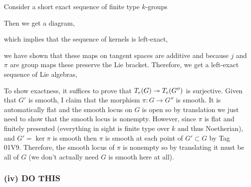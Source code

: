 \documentclass[12pt]{article}
\begin{document}
Consider a short exact sequence of finite type $k$-groups
\begin{center}
\end{center}
Then we get a diagram,
\begin{center}
\end{center}
which implies that the sequence of kernels is left-exact,
\begin{center}
\end{center}
we have shown that these maps on tangent spaces are additive and because $j$ and $\pi$ are group maps these preserve the Lie bracket. Therefore, we get a left-exact sequence of Lie algebras,
\begin{center}
\end{center}
To show exactness, it suffices to prove that $T_e(G) \twoheadrightarrow T_e(G'')$ is surjective. Given that $G'$ is smooth, I claim that the morphism $\pi : G \to G''$ is smooth. It is automatically flat and the smooth locus on $G$ is open so by translation we just need to show that the smooth locus is nonempty. However, since $\pi$ is flat and finitely presented (everything in sight is finite type over $k$ and thus Noetherian), and $G' = \ker{\pi}$ is smooth then $\pi$ is smooth at each point of $G' \subset G$ by Tag 01V9. Therefore, the smooth locus of $\pi$ is nonempty so by translating it must be all of $G$ (we don't actually need $G$ is smooth here at all).


\subsubsection{(iv) DO THIS}
\end{document}
